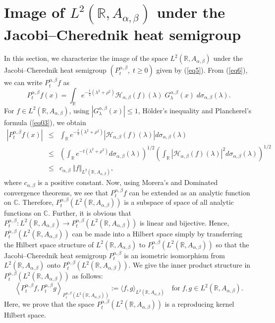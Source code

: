\documentclass[a4paper,11pt, reqno]{amsart}
\theoremstyle{plain}
\theoremstyle{definition}
\theoremstyle{remark}
\def \R{{\mathbb R}}
\def \C{{\mathbb C}}
\def\R{\mathbb R}
\def \H{{\mathcal H}}
\begin{document}
\section{Image of $L^2(\R, A_{\alpha, \beta})$ under the Jacobi--Cherednik heat semigroup}\label{sec5}

In this section, we characterize the image of the space $L^2(\R, A_{\alpha, \beta})$ under the Jacobi--Cherednik heat semigroup $\left(P^{\alpha, \beta}_t, \;t \geq 0\right)$ given by (\ref{eq5}). From (\ref{eq6}), we can write $P^{\alpha, \beta}_t f$ as
\begin{equation}\label{eq15}
P^{\alpha, \beta}_t f(x) = \int_{\R} e^{-\frac{t}{2}\left( \lambda^2+\rho^2\right)}  \H_{\alpha, \beta} (f)(\lambda) \; G^{\alpha, \beta}_\lambda(x) \; d\sigma_{\alpha, \beta}(\lambda).
\end{equation}
For $f \in L^2(\R, A_{\alpha, \beta})$, using $|G^{\alpha, \beta}_\lambda(x) | \leq 1$, H\"older's inequality and Plancherel's formula (\ref{eq03}), we obtain
\begin{eqnarray*}
\left| P^{\alpha, \beta}_t f(x) \right| 
& \leq & \int_{\R} e^{-\frac{t}{2}\left( \lambda^2+\rho^2\right)}  \left| \H_{\alpha, \beta} (f)(\lambda) \right|  d\sigma_{\alpha, \beta}(\lambda) \\
& \leq &  \left( \int_{\R} e^{-t \left( \lambda^2+\rho^2\right)} d\sigma_{\alpha, \beta}(\lambda) \right)^{1/2}
\left( \int_{\R} \left| \H_{\alpha, \beta} (f)(\lambda) \right|^2  d\sigma_{\alpha, \beta}(\lambda) \right)^{1/2} \\
& \leq & c_{\alpha, \beta} \; \Vert f \Vert_{ L^2(\R, A_{\alpha, \beta})},
\end{eqnarray*}
where $c_{\alpha, \beta}$ is a positive constant. Now, using Morera's and Dominated convergence theorems, we see that $P^{\alpha, \beta}_t f$ can be extended as an analytic function on $\C$. Therefore, $P^{\alpha, \beta}_t \left( L^2(\R, A_{\alpha, \beta}) \right)$ is a subspace of space of all analytic functions on $\C$. Further, it is obvious that $P^{\alpha, \beta}_t : L^2(\R, A_{\alpha, \beta}) \to P^{\alpha, \beta}_t \left( L^2(\R, A_{\alpha, \beta}) \right) $ is linear and bijective. Hence, $P^{\alpha, \beta}_t \left( L^2(\R, A_{\alpha, \beta})\right)$ can be made into a Hilbert space simply by transferring the Hilbert space structure of $ L^2(\R, A_{\alpha, \beta})$ to $P^{\alpha, \beta}_t \left( L^2(\R, A_{\alpha, \beta}) \right)$ so that the Jacobi--Cherednik heat semigroup $ P^{\alpha, \beta}_t $ is an isometric isomorphism from $L^2(\R, A_{\alpha, \beta})$ onto $P^{\alpha, \beta}_t \left( L^2(\R, A_{\alpha, \beta}) \right)$. We give the inner product structure in $P^{\alpha, \beta}_t \left( L^2(\R, A_{\alpha, \beta}) \right)$ as follows:
\[ \left\langle  P^{\alpha, \beta}_t f, P^{\alpha, \beta}_t g \right\rangle_{P^{\alpha, \beta}_t \left( L^2(\R, A_{\alpha, \beta}) \right)}:= \langle f , g \rangle_{L^2(\R, A_{\alpha, \beta})} \quad \text{for} \; f,g \in L^2(\R, A_{\alpha, \beta}). \]
Here, we prove that the space $P^{\alpha, \beta}_t \left( L^2(\R, A_{\alpha, \beta}) \right)$ is a reproducing kernel Hilbert space. 
\end{document}
